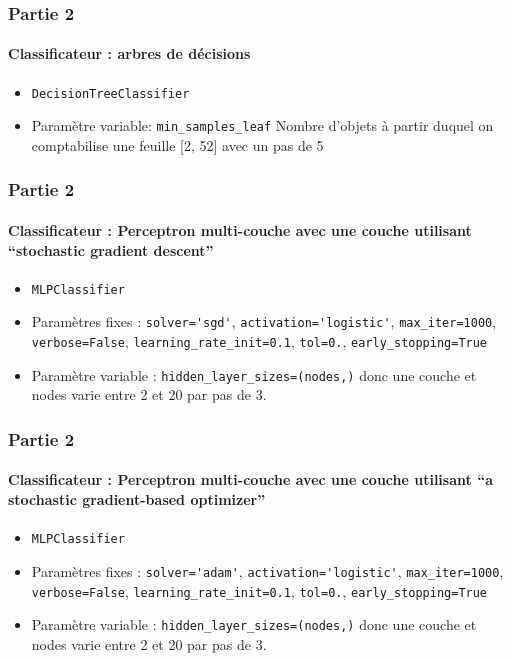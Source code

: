 \documentclass{beamer}
\begin{document}
    \begin{frame}[fragile]
        \frametitle{Partie 2}
        \framesubtitle{Classificateur : arbres de décisions}
        \begin{itemize}
            \item \verb?DecisionTreeClassifier?
            \item Paramètre variable: \verb?min_samples_leaf? Nombre d'objets à partir duquel on comptabilise une feuille [2, 52] avec un pas de 5
        \end{itemize}
    \end{frame}
    
    \begin{frame}[fragile]
        \frametitle{Partie 2}
        \framesubtitle{Classificateur : Perceptron multi-couche avec une couche utilisant ``stochastic gradient descent''}
        \begin{itemize}
            \item \verb?MLPClassifier?
            \item Paramètres fixes : \verb?solver='sgd'?, \verb?activation='logistic'?, \verb?max_iter=1000?, \verb?verbose=False?, \verb?learning_rate_init=0.1?, \verb?tol=0.?, \verb?early_stopping=True?
        
            \item Paramètre variable : \verb?hidden_layer_sizes=(nodes,)? donc une couche et nodes varie entre 2 et 20 par pas de 3.
        \end{itemize}
    \end{frame}
    
    \begin{frame}[fragile]
        \frametitle{Partie 2}
        \framesubtitle{Classificateur : Perceptron multi-couche avec une couche utilisant ``a stochastic gradient-based optimizer''}
        \begin{itemize}
            \item \verb?MLPClassifier?
            \item Paramètres fixes : \verb?solver='adam'?, \verb?activation='logistic'?, \verb?max_iter=1000?, \verb?verbose=False?, \verb?learning_rate_init=0.1?, \verb?tol=0.?, \verb?early_stopping=True?
        
            \item Paramètre variable : \verb?hidden_layer_sizes=(nodes,)? donc une couche et nodes varie entre 2 et 20 par pas de 3.
        \end{itemize}
    \end{frame}
    
\end{document}
